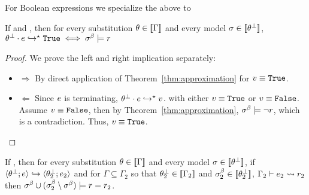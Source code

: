 For Boolean expressions we specialize the above to
\begin{corollary}\label{thm:embedding}
If  and
,
then for every substitution $\theta\in[\![\Gamma]\!]$
and every model $\sigma\in[\![\theta^\perp]\!]$,
${{\theta^\perp} \cdot {\ensuremath{e}} }\hookrightarrow^{\star}{\mathtt{True}} \iff \sigma^\beta \models r $
\end{corollary}
\begin{proof}
We prove the left and right implication separately:
\begin{itemize}
\item $\Rightarrow$
By direct application of Theorem~\ref{thm:approximation} for $v \equiv \mathtt{True}$. 

\item $\Leftarrow$ 
Since $e$ is terminating, 
${{\theta^\perp} \cdot {\ensuremath{e}} }\hookrightarrow^{\star}{v}$. 
with either $v \equiv \mathtt{True}$ or $v \equiv \mathtt{False}$. 
Assume $v \equiv \mathtt{False}$, then by Theorem~\ref{thm:approximation}, 
$\sigma^\beta \models \lnot r$, which is a contradiction. 
Thus, $v \equiv \mathtt{True}$.
\end{itemize}
\end{proof}


\begin{lemma}\label{lemma:approximation}
If ,
then for every substitution $\theta\in[\![\Gamma]\!]$
and every model $\sigma\in[\![\theta^\perp]\!]$,
if  
$\langle {\theta_{}^\perp}; e\rangle\hookrightarrow\langle {\theta_{2}^\perp}; e_2\rangle$
and
for $\Gamma \subseteq \Gamma_2$ so that ${\theta_{2}^\perp} \in [\![\Gamma_2]\!]$
and $\sigma^\beta_2\in[\![{\theta_{2}^\perp}]\!]$,
$ \Gamma_2\vdash e_2 \rightsquigarrow r_2 $
then 
$\sigma^\beta \cup (\sigma^\beta_2 \setminus \sigma^\beta) \models r = r_2$.
\end{lemma}


